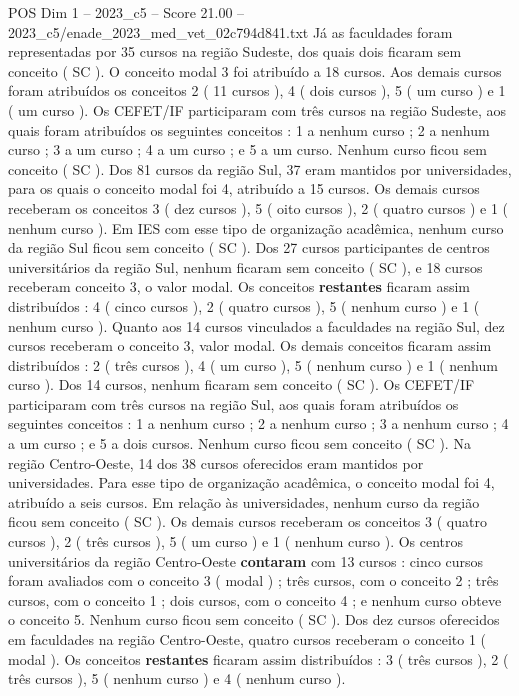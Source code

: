 \begin{textsample}{POS Dim 1 – 2023\_c5 – Score 21.00 – 2023\_c5/enade\_2023\_med\_vet\_02c794d841.txt}
Já as faculdades foram representadas por 35 cursos na região Sudeste, dos quais dois ficaram sem conceito ( SC ).
O conceito modal 3 foi atribuído a 18 cursos.
Aos demais cursos foram atribuídos os conceitos 2 ( 11 cursos ), 4 ( dois cursos ), 5 ( um curso ) e 1 ( um curso ).
Os CEFET/IF participaram com três cursos na região Sudeste, aos quais foram atribuídos os seguintes conceitos : 1 a nenhum curso ; 2 a nenhum curso ; 3 a um curso ; 4 a um curso ; e 5 a um curso.
Nenhum curso ficou sem conceito ( SC ).
Dos 81 cursos da região Sul, 37 eram mantidos por universidades, para os quais o conceito modal foi 4, atribuído a 15 cursos.
Os demais cursos receberam os conceitos 3 ( dez cursos ), 5 ( oito cursos ), 2 ( quatro cursos ) e 1 ( nenhum curso ).
Em IES com esse tipo de organização acadêmica, nenhum curso da região Sul ficou sem conceito ( SC ).
Dos 27 cursos participantes de centros universitários da região Sul, nenhum ficaram sem conceito ( SC ), e 18 cursos receberam conceito 3, o valor modal.
Os conceitos \textbf{restantes} ficaram assim distribuídos : 4 ( cinco cursos ), 2 ( quatro cursos ), 5 ( nenhum curso ) e 1 ( nenhum curso ).
Quanto aos 14 cursos vinculados a faculdades na região Sul, dez cursos receberam o conceito 3, valor modal.
Os demais conceitos ficaram assim distribuídos : 2 ( três cursos ), 4 ( um curso ), 5 ( nenhum curso ) e 1 ( nenhum curso ).
Dos 14 cursos, nenhum ficaram sem conceito ( SC ).
Os CEFET/IF participaram com três cursos na região Sul, aos quais foram atribuídos os seguintes conceitos : 1 a nenhum curso ; 2 a nenhum curso ; 3 a nenhum curso ; 4 a um curso ; e 5 a dois cursos.
Nenhum curso ficou sem conceito ( SC ).
Na região Centro-Oeste, 14 dos 38 cursos oferecidos eram mantidos por universidades.
Para esse tipo de organização acadêmica, o conceito modal foi 4, atribuído a seis cursos.
Em relação às universidades, nenhum curso da região ficou sem conceito ( SC ).
Os demais cursos receberam os conceitos 3 ( quatro cursos ), 2 ( três cursos ), 5 ( um curso ) e 1 ( nenhum curso ).
Os centros universitários da região Centro-Oeste \textbf{contaram} com 13 cursos : cinco cursos foram avaliados com o conceito 3 ( modal ) ; três cursos, com o conceito 2 ; três cursos, com o conceito 1 ; dois cursos, com o conceito 4 ; e nenhum curso obteve o conceito 5.
Nenhum curso ficou sem conceito ( SC ).
Dos dez cursos oferecidos em faculdades na região Centro-Oeste, quatro cursos receberam o conceito 1 ( modal ).
Os conceitos \textbf{restantes} ficaram assim distribuídos : 3 ( três cursos ), 2 ( três cursos ), 5 ( nenhum curso ) e 4 ( nenhum curso ).

\end{textsample}

